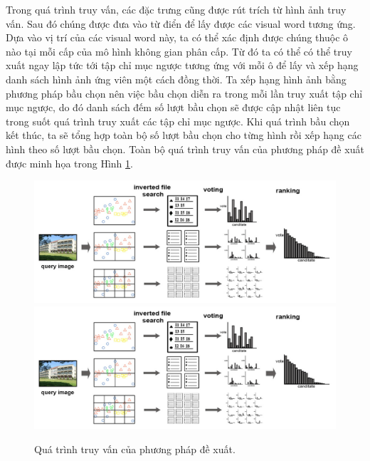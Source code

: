 Trong quá trình truy vấn, các đặc trưng cũng được rút trích từ hình ảnh truy vấn. Sau đó chúng được đưa vào từ điển để lấy được các visual word tương ứng. Dựa vào vị trí của các visual word này, ta có thể xác định được chúng thuộc ô nào tại mỗi cấp của mô hình không gian phân cấp. Từ đó ta có thể có thể truy xuất ngay lập tức tới tập chỉ mục ngược tương ứng với mỗi ô để lấy và xếp hạng danh sách hình ảnh ứng viên một cách đồng thời. Ta xếp hạng hình ảnh bằng phương pháp bầu chọn nên việc bầu chọn diễn ra trong mỗi lần truy xuất tập chỉ mục ngược, do đó danh sách đếm số lượt bầu chọn sẽ được cập nhật liên tục trong suốt quá trình truy xuất các tập chỉ mục ngược. Khi quá trình bầu chọn kết thúc, ta sẽ tổng hợp toàn bộ số lượt bầu chọn cho từng hình rồi xếp hạng các hình theo số lượt bầu chọn. Toàn bộ quá trình truy vấn của phương pháp đề xuất được minh họa trong Hình \ref{FigQueryProcess}.

\begin{figure}[!htbp]
  \begin{center}
    \leavevmode
    \ifpdf
      \includegraphics[scale=0.25]{queryProcess}
    \else
      \includegraphics[scale=0.25]{queryProcess}
    \fi
    \caption[Quá trình truy vấn của phương pháp đề xuất]{Quá trình truy vấn của phương pháp đề xuất.}
    \label{FigQueryProcess}
  \end{center}
\end{figure}
